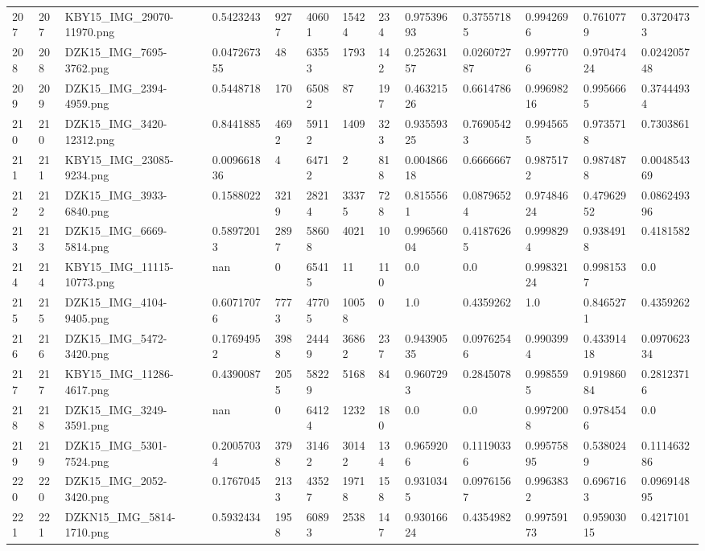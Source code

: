 \documentclass[11pt, a4paper, twoside]{report}
\begin{document}
\begin{longtable}[c]{@{}lllllllllllll@{}}
207 & 207 & KBY15\_IMG\_29070-11970.png & 0.5423243 & 9277 & 40601 & 15424 & 234 & 0.97539693 & 0.37557185 & 0.9942696 & 0.7610779 & 0.37204733 \\
208 & 208 & DZK15\_IMG\_7695-3762.png & 0.047267355 & 48 & 63553 & 1793 & 142 & 0.25263157 & 0.026072787 & 0.9977706 & 0.97047424 & 0.024205748 \\
209 & 209 & DZK15\_IMG\_2394-4959.png & 0.5448718 & 170 & 65082 & 87 & 197 & 0.46321526 & 0.6614786 & 0.99698216 & 0.9956665 & 0.37444934 \\
210 & 210 & DZK15\_IMG\_3420-12312.png & 0.8441885 & 4692 & 59112 & 1409 & 323 & 0.93559325 & 0.76905423 & 0.9945655 & 0.9735718 & 0.7303861 \\
211 & 211 & KBY15\_IMG\_23085-9234.png & 0.009661836 & 4 & 64712 & 2 & 818 & 0.00486618 & 0.6666667 & 0.9875172 & 0.9874878 & 0.004854369 \\
212 & 212 & DZK15\_IMG\_3933-6840.png & 0.1588022 & 3219 & 28214 & 33375 & 728 & 0.8155561 & 0.08796524 & 0.97484624 & 0.47962952 & 0.086249396 \\
213 & 213 & DZK15\_IMG\_6669-5814.png & 0.58972013 & 2897 & 58608 & 4021 & 10 & 0.99656004 & 0.41876265 & 0.9998294 & 0.9384918 & 0.4181582 \\
214 & 214 & KBY15\_IMG\_11115-10773.png & nan & 0 & 65415 & 11 & 110 & 0.0 & 0.0 & 0.99832124 & 0.9981537 & 0.0 \\
215 & 215 & DZK15\_IMG\_4104-9405.png & 0.60717076 & 7773 & 47705 & 10058 & 0 & 1.0 & 0.4359262 & 1.0 & 0.8465271 & 0.4359262 \\
216 & 216 & DZK15\_IMG\_5472-3420.png & 0.17694952 & 3988 & 24449 & 36862 & 237 & 0.94390535 & 0.09762546 & 0.9903994 & 0.43391418 & 0.097062334 \\
217 & 217 & KBY15\_IMG\_11286-4617.png & 0.4390087 & 2055 & 58229 & 5168 & 84 & 0.9607293 & 0.2845078 & 0.9985595 & 0.91986084 & 0.28123716 \\
218 & 218 & DZK15\_IMG\_3249-3591.png & nan & 0 & 64124 & 1232 & 180 & 0.0 & 0.0 & 0.9972008 & 0.9784546 & 0.0 \\
219 & 219 & DZK15\_IMG\_5301-7524.png & 0.20057034 & 3798 & 31462 & 30142 & 134 & 0.9659206 & 0.11190336 & 0.99575895 & 0.5380249 & 0.111463286 \\
220 & 220 & DZK15\_IMG\_2052-3420.png & 0.1767045 & 2133 & 43527 & 19718 & 158 & 0.9310345 & 0.09761567 & 0.9963832 & 0.6967163 & 0.096914895 \\
221 & 221 & DZKN15\_IMG\_5814-1710.png & 0.5932434 & 1958 & 60893 & 2538 & 147 & 0.93016624 & 0.4354982 & 0.99759173 & 0.95903015 & 0.4217101 \\

\end{longtable}
\end{document}
